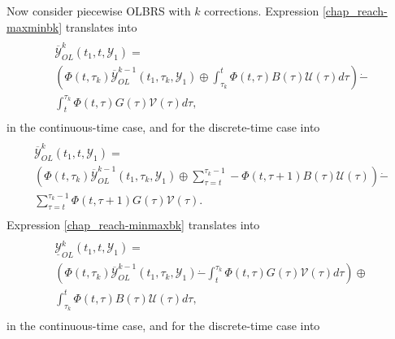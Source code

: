 \documentclass[letterpaper,10pt,english]{sphinxmanual}
\begin{document}
Now consider piecewise OLBRS with \(k\) corrections. Expression
\eqref{chap_reach-maxminbk} translates into
\label{chap_reach:equation-ctlsmaxminbk}\begin{gather}
\begin{split}\begin{array}{l}
\overline{{\mathcal Y}}_{OL}^k(t_1, t, {\mathcal Y}_1) = \\
\left(\Phi(t, \tau_k)\overline{{\mathcal Y}}_{OL}^{k-1}(t_1, \tau_k, {\mathcal Y}_1) \oplus
\int_{\tau_k}^t\Phi(t, \tau)B(\tau){\mathcal U}(\tau)d\tau\right) \dot{-} \\
\int^{\tau_k}_t\Phi(t, \tau)G(\tau){\mathcal V}(\tau)d\tau,
\end{array}\end{split}\label{chap_reach-ctlsmaxminbk}
\end{gather}
in the continuous-time case, and for the discrete-time case into
\label{chap_reach:equation-dtlsmaxminbk}\begin{gather}
\begin{split}\begin{array}{l}
\overline{{\mathcal Y}}_{OL}^k(t_1, t, {\mathcal Y}_1) = \\
\left(\Phi(t, \tau_k)\overline{{\mathcal Y}}_{OL}^{k-1}(t_1, \tau_k, {\mathcal Y}_1) \oplus
\sum_{\tau=t}^{\tau_k-1}-\Phi(t, \tau+1)B(\tau){\mathcal U}(\tau)\right) \dot{-} \\
\sum_{\tau=t}^{\tau_k-1}\Phi(t, \tau+1)G(\tau){\mathcal V}(\tau).
\end{array}\end{split}\label{chap_reach-dtlsmaxminbk}
\end{gather}
Expression \eqref{chap_reach-minmaxbk} translates into
\label{chap_reach:equation-ctlsminmaxbk}\begin{gather}
\begin{split}\begin{array}{l}
\underline{{\mathcal Y}}_{OL}^k(t_1, t, {\mathcal Y}_1) = \\
\left(\Phi(t, \tau_k)\overline{{\mathcal Y}}_{OL}^{k-1}(t_1, \tau_k, {\mathcal Y}_1) \dot{-}
\int^{\tau_k}_t\Phi(t, \tau)G(\tau){\mathcal V}(\tau)d\tau\right)
\oplus \\
\int_{\tau_k}^t\Phi(t, \tau)B(\tau){\mathcal U}(\tau)d\tau,
\end{array}\end{split}\label{chap_reach-ctlsminmaxbk}
\end{gather}
in the continuous-time case, and for the discrete-time case into
\end{document}
